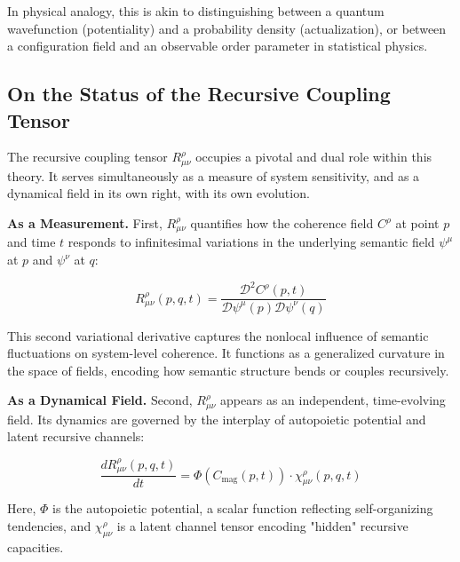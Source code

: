 In physical analogy, this is akin to distinguishing between a quantum wavefunction (potentiality) and a probability density (actualization), or between a configuration field and an observable order parameter in statistical physics.


\subsection{On the Status of the Recursive Coupling Tensor}
\label{2.4.7:on_the_status_of_the_recursive_coupling_tensor}

The recursive coupling tensor \(R^\rho_{\mu\nu}\) occupies a pivotal and dual role within this theory. It serves simultaneously as a measure of system sensitivity, and as a dynamical field in its own right, with its own evolution.

\textbf{As a Measurement.} First, \(R^\rho_{\mu\nu}\) quantifies how the coherence field \(C^\rho\) at point \(p\) and time \(t\) responds to infinitesimal variations in the underlying semantic field \(\psi^\mu\) at \(p\) and \(\psi^\nu\) at \(q\):

\begin{equation}
\label{eq:R_measurement}
R^\rho_{\mu\nu}(p, q, t) = \frac{\mathcal{D}^2 C^\rho(p, t)}{\mathcal{D} \psi^\mu(p) \mathcal{D} \psi^\nu(q)}
\end{equation}

This second variational derivative captures the nonlocal influence of semantic fluctuations on system-level coherence. It functions as a generalized curvature in the space of fields, encoding how semantic structure bends or couples recursively.

\textbf{As a Dynamical Field.} Second, \(R^\rho_{\mu\nu}\) appears as an independent, time-evolving field. Its dynamics are governed by the interplay of autopoietic potential and latent recursive channels:

\begin{equation}
\label{eq:R_dynamical}
\frac{dR^\rho_{\mu\nu}(p, q, t)}{dt} = \Phi(C_{\mathrm{mag}}(p, t)) \cdot \chi^\rho_{\mu\nu}(p, q, t)
\end{equation}

Here, \(\Phi\) is the autopoietic potential, a scalar function reflecting self-organizing tendencies, and \(\chi^\rho_{\mu\nu}\) is a latent channel tensor encoding "hidden" recursive capacities.

